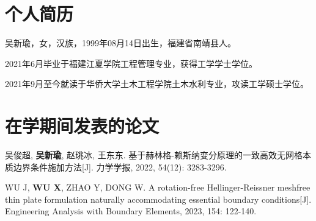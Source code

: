 \begin{cv}
    \section*{个人简历}
    吴新瑜，女，汉族，1999年08月14日出生，福建省南靖县人。\par
    2021年6月毕业于福建江夏学院工程管理专业，获得工学学士学位。\par
    2021年9月至今就读于华侨大学土木工程学院土木水利专业，攻读工学硕士学位。
    \section*{在学期间发表的论文}
    \begin{enumerate}[{[1]}]
        \item 吴俊超, \textbf{吴新瑜}, 赵珧冰, 王东东. 基于赫林格-赖斯纳变分原理的一致高效无网格本质边界条件施加方法[J]. 力学学报, 2022, 54(12): 3283-3296.
        \item WU J, \textbf{WU X}, ZHAO Y, DONG W. A rotation-free Hellinger-Reissner meshfree thin plate formulation naturally accommodating essential boundary conditions[J]. Engineering Analysis with Boundary Elements, 2023, 154: 122-140.
    \end{enumerate}
\end{cv}
